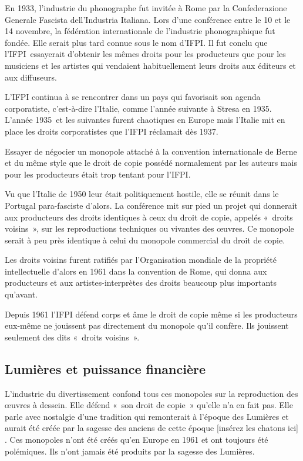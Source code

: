 En 1933, l'industrie du phonographe fut invitée à Rome par la  Confederazione Generale Fascista dell’Industria Italiana. Lors d'une conférence entre le 10 et le 14 novembre, la fédération
internationale de l'industrie phonographique fut fondée. Elle serait plus tard connue sous le nom d'IFPI. Il fut conclu que l'IFPI essayerait d'obtenir les mêmes droits pour les producteurs que pour
les musiciens et les artistes qui vendaient habituellement leurs droits aux éditeurs et aux diffuseurs.

L'IFPI continua à se rencontrer dans un pays qui favorisait son agenda corporatiste, c'est-à-dire l'Italie, comme l'année suivante à Stresa en 1935. L'année 1935 et les suivantes furent chaotiques
en Europe mais l'Italie mit en place les droits corporatistes que l'IFPI réclamait dès 1937.

Essayer de négocier un monopole attaché à la convention internationale de Berne et du même style que le droit de copie possédé normalement par les auteurs mais pour les producteurs était trop tentant
pour l'IFPI. 

Vu que l'Italie de 1950 leur était politiquement hostile, elle se réunit dans le Portugal para-fasciste d'alors. La conférence mit sur pied un projet qui donnerait aux producteurs des droits
identiques à ceux du droit de copie, appelés «~droits voisins~», sur les reproductions techniques ou vivantes des œuvres. Ce monopole serait à peu près
identique à celui du monopole
commercial du droit de copie.

Les droits voisins furent ratifiés par l'Organisation mondiale de la propriété intellectuelle d'alors en 1961 dans la convention de Rome, qui donna aux producteurs et aux artistes-interprètes des droits beaucoup
plus importants qu'avant.

Depuis 1961 l'IFPI défend corps et âme le droit de copie même si les producteurs eux-même ne jouissent pas directement du monopole qu'il confère. Ils jouissent seulement des dits «~droits voisins~».

\subsection{Lumières et puissance financière}
L'industrie du divertissement confond tous ces monopoles sur la reproduction des œuvres à dessein. Elle défend «~son droit de copie~» qu'elle n'a en fait pas. Elle parle avec
nostalgie d'une tradition qui remonterait à l'époque des Lumières et aurait été créée par la sagesse des anciens de cette époque [insérez les chatons ici] . Ces monopoles n'ont été créés qu'en Europe
en 1961 et ont toujours été polémiques. Ils n'ont jamais été produits par la sagesse des Lumières.

